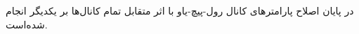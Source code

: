 در پایان اصلاح پارامترهای کانال رول-پیچ-یاو با اثر متقابل تمام کانال‌ها بر یکدیگر انجام شده‌است.

%	

